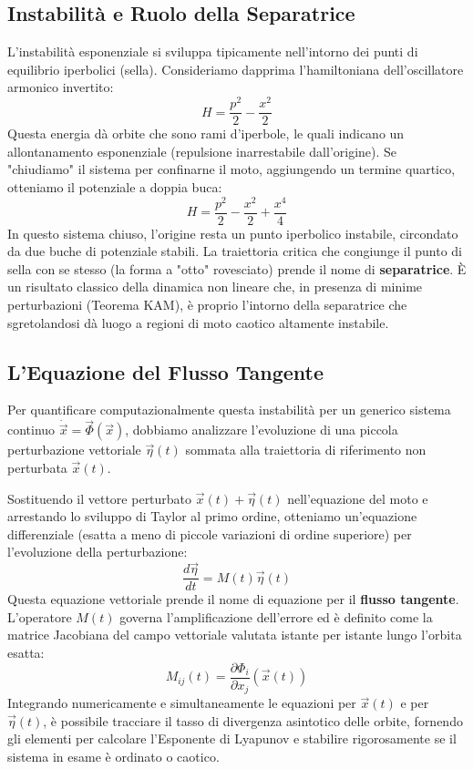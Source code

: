 \documentclass[12pt,a4paper]{article}
\begin{document}
\subsection{Instabilità e Ruolo della Separatrice}
L'instabilità esponenziale si sviluppa tipicamente nell'intorno dei punti di equilibrio iperbolici (sella). Consideriamo dapprima l'hamiltoniana dell'oscillatore armonico invertito:
\begin{equation}
H = \frac{p^2}{2} - \frac{x^2}{2}
\end{equation}
Questa energia dà orbite che sono rami d'iperbole, le quali indicano un allontanamento esponenziale (repulsione inarrestabile dall'origine). Se "chiudiamo" il sistema per confinarne il moto, aggiungendo un termine quartico, otteniamo il potenziale a doppia buca:
\begin{equation}
H = \frac{p^2}{2} - \frac{x^2}{2} + \frac{x^4}{4}
\end{equation}
In questo sistema chiuso, l'origine resta un punto iperbolico instabile, circondato da due buche di potenziale stabili. La traiettoria critica che congiunge il punto di sella con se stesso (la forma a "otto" rovesciato) prende il nome di \textbf{separatrice}. È un risultato classico della dinamica non lineare che, in presenza di minime perturbazioni (Teorema KAM), è proprio l'intorno della separatrice che sgretolandosi dà luogo a regioni di moto caotico altamente instabile.

\subsection{L'Equazione del Flusso Tangente}
Per quantificare computazionalmente questa instabilità per un generico sistema continuo $\dot{\vec{x}} = \vec{\Phi}(\vec{x})$, dobbiamo analizzare l'evoluzione di una piccola perturbazione vettoriale $\vec{\eta}(t)$ sommata alla traiettoria di riferimento non perturbata $\vec{x}(t)$.

Sostituendo il vettore perturbato $\vec{x}(t) + \vec{\eta}(t)$ nell'equazione del moto e arrestando lo sviluppo di Taylor al primo ordine, otteniamo un'equazione differenziale (esatta a meno di piccole variazioni di ordine superiore) per l'evoluzione della perturbazione:
\begin{equation}
\frac{d\vec{\eta}}{dt} = M(t)\vec{\eta}(t)
\end{equation}
Questa equazione vettoriale prende il nome di equazione per il \textbf{flusso tangente}. L'operatore $M(t)$ governa l'amplificazione dell'errore ed è definito come la matrice Jacobiana del campo vettoriale valutata istante per istante lungo l'orbita esatta:
\begin{equation}
M_{ij}(t) = \frac{\partial \Phi_i}{\partial x_j}(\vec{x}(t))
\end{equation}
Integrando numericamente e simultaneamente le equazioni per $\vec{x}(t)$ e per $\vec{\eta}(t)$, è possibile tracciare il tasso di divergenza asintotico delle orbite, fornendo gli elementi per calcolare l'Esponente di Lyapunov e stabilire rigorosamente se il sistema in esame è ordinato o caotico.
\end{document}

